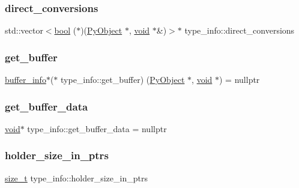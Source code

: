 \subsubsection{\texorpdfstring{direct\_conversions}{direct\_conversions}}
{\footnotesize\ttfamily std\+::vector$<$\mbox{\hyperlink{asdl_8h_af6a258d8f3ee5206d682d799316314b1}{bool}} ($\ast$)(\mbox{\hyperlink{_python27_2object_8h_aadc84ac7aed2cfa6f20c25f62bf3dac7}{Py\+Object}} $\ast$, \mbox{\hyperlink{_s_d_l__opengles2__gl2ext_8h_ae5d8fa23ad07c48bb609509eae494c95}{void}} $\ast$\&)$>$$\ast$ type\+\_\+info\+::direct\+\_\+conversions}

\mbox{\label{structtype__info_ae6e0ffbd11cb347896494ead333b8e4d}} 
\subsubsection{\texorpdfstring{get\_buffer}{get\_buffer}}
{\footnotesize\ttfamily \mbox{\hyperlink{structbuffer__info}{buffer\+\_\+info}}$\ast$($\ast$ type\+\_\+info\+::get\+\_\+buffer) (\mbox{\hyperlink{_python27_2object_8h_aadc84ac7aed2cfa6f20c25f62bf3dac7}{Py\+Object}} $\ast$, \mbox{\hyperlink{_s_d_l__opengles2__gl2ext_8h_ae5d8fa23ad07c48bb609509eae494c95}{void}} $\ast$) = nullptr}

\mbox{\label{structtype__info_a610a9a58683d2cb70158fd084bd1f30b}} 
\subsubsection{\texorpdfstring{get\_buffer\_data}{get\_buffer\_data}}
{\footnotesize\ttfamily \mbox{\hyperlink{_s_d_l__opengles2__gl2ext_8h_ae5d8fa23ad07c48bb609509eae494c95}{void}}$\ast$ type\+\_\+info\+::get\+\_\+buffer\+\_\+data = nullptr}

\mbox{\label{structtype__info_a41c3d2416443b60665994a348e556cf8}} 
\subsubsection{\texorpdfstring{holder\_size\_in\_ptrs}{holder\_size\_in\_ptrs}}
{\footnotesize\ttfamily \mbox{\hyperlink{detail_2common_8h_a801d6a451a01953ef8cbae6feb6a3638}{size\+\_\+t}} type\+\_\+info\+::holder\+\_\+size\+\_\+in\+\_\+ptrs}

